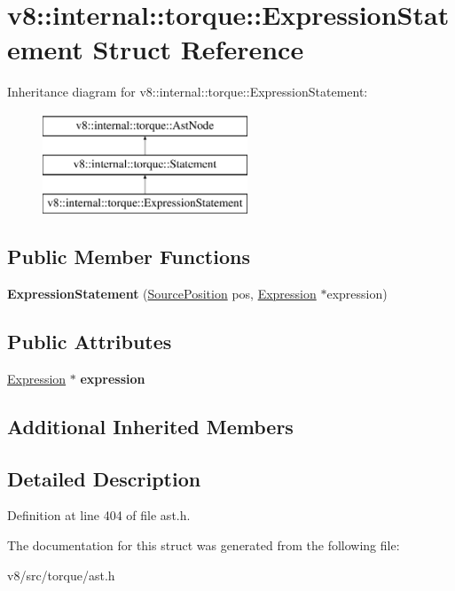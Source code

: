 \hypertarget{structv8_1_1internal_1_1torque_1_1ExpressionStatement}{}\section{v8\+:\+:internal\+:\+:torque\+:\+:Expression\+Statement Struct Reference}
\label{structv8_1_1internal_1_1torque_1_1ExpressionStatement}
Inheritance diagram for v8\+:\+:internal\+:\+:torque\+:\+:Expression\+Statement\+:\begin{figure}[H]
\begin{center}
\leavevmode
\includegraphics[height=3.000000cm]{structv8_1_1internal_1_1torque_1_1ExpressionStatement}
\end{center}
\end{figure}
\subsection*{Public Member Functions}
\begin{DoxyCompactItemize}
\item 
\mbox{\label{structv8_1_1internal_1_1torque_1_1ExpressionStatement_aef8faa54013286f9cf1a67334bd76835}} 
{\bfseries Expression\+Statement} (\mbox{\hyperlink{structv8_1_1internal_1_1torque_1_1SourcePosition}{Source\+Position}} pos, \mbox{\hyperlink{structv8_1_1internal_1_1torque_1_1Expression}{Expression}} $\ast$expression)
\end{DoxyCompactItemize}
\subsection*{Public Attributes}
\begin{DoxyCompactItemize}
\item 
\mbox{\label{structv8_1_1internal_1_1torque_1_1ExpressionStatement_a4930e5c6c8e45e543e38a9584bef68b6}} 
\mbox{\hyperlink{structv8_1_1internal_1_1torque_1_1Expression}{Expression}} $\ast$ {\bfseries expression}
\end{DoxyCompactItemize}
\subsection*{Additional Inherited Members}


\subsection{Detailed Description}


Definition at line 404 of file ast.\+h.



The documentation for this struct was generated from the following file\+:\begin{DoxyCompactItemize}
\item 
v8/src/torque/ast.\+h\end{DoxyCompactItemize}
